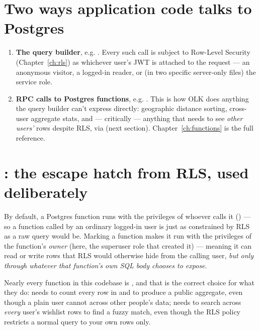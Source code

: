 \section{Two ways application code talks to Postgres}

\begin{enumerate}
  \item \textbf{The query builder}, e.g. . Every such call is subject to Row-Level Security (Chapter~\ref{ch:rls}) as whichever user's JWT is attached to the request — an anonymous visitor, a logged-in reader, or (in two specific server-only files) the service role.
  \item \textbf{RPC calls to Postgres functions}, e.g. . This is how OLK does anything the query builder can't express directly: geographic distance sorting, cross-user aggregate stats, and — critically — anything that needs to see \emph{other users'} rows despite RLS, via  (next section). Chapter~\ref{ch:functions} is the full reference.
\end{enumerate}

\section{: the escape hatch from RLS, used deliberately}

By default, a Postgres function runs with the privileges of whoever calls it () — so a function called by an ordinary logged-in user is just as constrained by RLS as a raw query would be. Marking a function  makes it run with the privileges of the function's \emph{owner} (here, the  superuser role that created it) — meaning it can read or write rows that RLS would otherwise hide from the calling user, \emph{but only through whatever that function's own SQL body chooses to expose}.

Nearly every function in this codebase is , and that is the correct choice for what they do:  needs to count every row in  and  to produce a public aggregate, even though a plain user cannot  across other people's data;  needs to search across \emph{every} user's wishlist rows to find a fuzzy match, even though the  RLS policy restricts a normal query to your own rows only.

